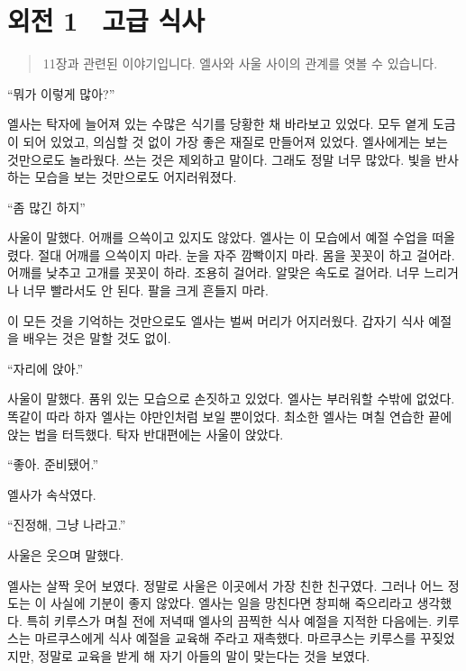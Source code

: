 

\chapter[외전1. 고급 식사][외전 1\hspace*{.5em}고급 식사]{외전 1 \ 고급 식사}



\begin{quote}

\small 11장과 관련된 이야기입니다. 엘사와 사울 사이의 관계를 엿볼 수 있습니다.

\end{quote} %

``뭐가 이렇게 많아?''

엘사는 탁자에 늘어져 있는 수많은 식기를 당황한 채 바라보고 있었다. 모두 옅게 도금이 되어 있었고, 의심할 것 없이 가장 좋은 재질로 만들어져 있었다. 엘사에게는 보는 것만으로도 놀라웠다. 쓰는 것은 제외하고 말이다. 그래도 정말 너무 많았다. 빛을 반사하는 모습을 보는 것만으로도 어지러워졌다.

``좀 많긴 하지''

사울이 말했다. 어깨를 으쓱이고 있지도 않았다. 엘사는 이 모습에서 예절 수업을 떠올렸다. 절대 어깨를 으쓱이지 마라. 눈을 자주 깜빡이지 마라. 몸을 꼿꼿이 하고 걸어라. 어깨를 낮추고 고개를 꼿꼿이 하라. 조용히 걸어라. 알맞은 속도로 걸어라. 너무 느리거나 너무 빨라서도 안 된다. 팔을 크게 흔들지 마라.

이 모든 것을 기억하는 것만으로도 엘사는 벌써 머리가 어지러웠다. 갑자기 식사 예절을 배우는 것은 말할 것도 없이.

``자리에 앉아.''

사울이 말했다. 품위 있는 모습으로 손짓하고 있었다. 엘사는 부러워할 수밖에 없었다. 똑같이 따라 하자 엘사는 야만인처럼 보일 뿐이었다. 최소한 엘사는 며칠 연습한 끝에 앉는 법을 터득했다. 탁자 반대편에는 사울이 앉았다.

``좋아. 준비됐어.''

엘사가 속삭였다.

``진정해, 그냥 나라고.''

사울은 웃으며 말했다.

엘사는 살짝 웃어 보였다. 정말로 사울은 이곳에서 가장 친한 친구였다. 그러나 어느 정도는 이 사실에 기분이 좋지 않았다. 엘사는 일을 망친다면 창피해 죽으리라고 생각했다. 특히 키루스가 며칠 전에 저녁때 엘사의 끔찍한 식사 예절을 지적한 다음에는. 키루스는 마르쿠스에게 식사 예절을 교육해 주라고 재촉했다. 마르쿠스는 키루스를 꾸짖었지만, 정말로 교육을 받게 해 자기 아들의 말이 맞는다는 것을 보였다.

